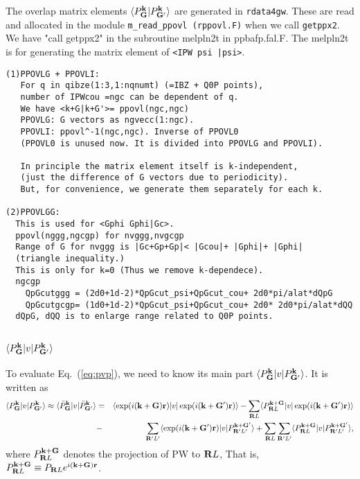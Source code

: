 \documentclass[a4paper,10pt,epsf,fleqn]{article}
\newcommand{\bfk}{{\bf k}}
\newcommand{\bfr}{{\bf r}}
\newcommand{\bfG}{{\bf G}}
\newcommand{\bfR}{{\bf R}}
\newcommand{\req}[1]{\mbox{Eq.~(\ref{#1})}}
\begin{document}
The overlap matrix elements 
$\langle {P}^{\bf k}_{{\bf G}}|{P}^{\bf k}_{{\bf G'}}\rangle$ 
are generated in \verb!rdata4gw!.
These are read and allocated in the module 
\verb!m_read_ppovl (rppovl.F)! when we call 
\verb!getppx2!. We have "call getppx2" in the
subroutine melpln2t in ppbafp.fal.F.
The melpln2t is for generating the matrix element of
\verb!<IPW psi |psi>!.

\begin{verbatim}
(1)PPOVLG + PPOVLI:
   For q in qibze(1:3,1:nqnumt) (=IBZ + Q0P points), 
   number of IPWcou =ngc can be dependent of q.
   We have <k+G|k+G'>= ppovl(ngc,ngc) 
   PPOVLG: G vectors as ngvecc(1:ngc).
   PPOVLI: ppovl^-1(ngc,ngc). Inverse of PPOVL0
   (PPOVL0 is unused now. It is divided into PPOVLG and PPOVLI).

   In principle the matrix element itself is k-independent,
   (just the difference of G vectors due to periodicity).
   But, for convenience, we generate them separately for each k.

(2)PPOVLGG: 
  This is used for <Gphi Gphi|Gc>.
  ppovl(nggg,ngcgp) for nvggg,nvgcgp
  Range of G for nvggg is |Gc+Gp+Gp|< |Gcou|+ |Gphi|+ |Gphi| 
  (triangle inequality.)
  This is only for k=0 (Thus we remove k-dependece).
  ngcgp 
    QpGcutggg = (2d0+1d-2)*QpGcut_psi+QpGcut_cou+ 2d0*pi/alat*dQpG 
    QpGcutgcgp= (1d0+1d-2)*QpGcut_psi+QpGcut_cou+ 2d0* 2d0*pi/alat*dQQ
  dQpG, dQQ is to enlarge range related to Q0P points.

\end{verbatim}


\subsection{$\langle {P}^\bfk_\bfG |v| {P}^\bfk_{\bfG'} \rangle$}
To evaluate \req{eq:pvp}, we need to know 
its main part $\langle {P}^\bfk_\bfG |v| {P}^\bfk_{\bfG'} \rangle$. It is written as
\begin{eqnarray}
\langle {P}^\bfk_\bfG |v| {P}^\bfk_{\bfG'} \rangle
\approx
\langle \bar{P}^\bfk_\bfG |v| \bar{P}^\bfk_{\bfG'} \rangle
&=&\langle \exp(i(\bfk+\bfG)\bfr) |v| \exp(i(\bfk+\bfG')\bfr) \rangle
-\sum_{\bfR{L}} 
\langle P^{\bfk+\bfG}_{\bfR{L}}|v| \exp(i(\bfk+\bfG')\bfr) \rangle \nonumber \\
&-&\sum_{\bfR'{L'}} 
\langle \exp(i(\bfk+\bfG')\bfr) |v| P^{\bfk+\bfG'}_{\bfR'{L'}}\rangle
+\sum_{\bfR{L}} \sum_{\bfR'{L'}} 
\langle P^{\bfk+\bfG}_{\bfR{L}}|v|P^{\bfk+\bfG'}_{\bfR'{L'}} \rangle,
\label{eq:barpvbarp}
\end{eqnarray}
where $P^{\bfk+\bfG}_{\bfR{L}}$ denotes 
the projection of PW to ${\bfR{L}}$,
That is, 
$P^{\bfk+\bfG}_{\bfR{L}} \equiv 
{P}_{\bfR{L}} e^{i ({\bf k+ G}){\bf r}}$.
\end{document}
